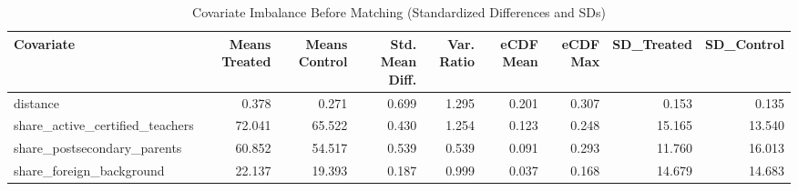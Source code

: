 \begin{table}

\caption{\label{tab:tab:balance_before}Covariate Imbalance Before Matching (Standardized Differences and SDs)}
\centering
\begin{tabular}[t]{lrrrrrrrr}
\toprule
Covariate & Means Treated & Means Control & Std. Mean Diff. & Var. Ratio & eCDF Mean & eCDF Max & SD\_Treated & SD\_Control\\
\midrule
distance & 0.378 & 0.271 & 0.699 & 1.295 & 0.201 & 0.307 & 0.153 & 0.135\\
share\_active\_certified\_teachers & 72.041 & 65.522 & 0.430 & 1.254 & 0.123 & 0.248 & 15.165 & 13.540\\
share\_postsecondary\_parents & 60.852 & 54.517 & 0.539 & 0.539 & 0.091 & 0.293 & 11.760 & 16.013\\
share\_foreign\_background & 22.137 & 19.393 & 0.187 & 0.999 & 0.037 & 0.168 & 14.679 & 14.683\\
\bottomrule
\end{tabular}
\end{table}
